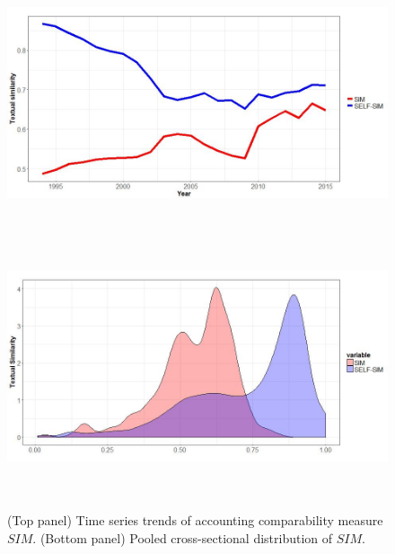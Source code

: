 \documentclass[thesis]{thesis-umich}
\begin{document}
\begin{figure}[H] 
\centering
\includegraphics[width=6in, height=3in]{figures/cossim-year}
\vspace{10mm}
\includegraphics[width=6in, height=3in]{figures/cossim-dist}
\caption[\textbf{Time-series and cross-sectional distribution of $SIM$}]{\footnotesize (Top panel) Time series trends of accounting comparability measure $SIM$. (Bottom panel) Pooled cross-sectional distribution of $SIM$.} \label{cossim-figures}
\end{figure} 
\newpage
\end{document}
